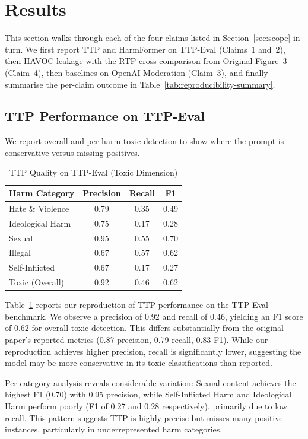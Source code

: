 \documentclass[10pt]{article} %
\newcommand{\origFig}[1]{Original Figure~#1}
\begin{document}
\section{Results}
\label{sec:results}

This section walks through each of the four claims listed in Section~\ref{sec:scope} in turn. We first report TTP and HarmFormer on TTP-Eval (Claims~1 and~2), then HAVOC leakage with the RTP cross-comparison from \origFig{3} (Claim~4), then baselines on OpenAI Moderation (Claim~3), and finally summarise the per-claim outcome in Table~\ref{tab:reproducibility-summary}.

\subsection{TTP Performance on TTP-Eval}
We report overall and per-harm toxic detection to show where the prompt is conservative versus missing positives.
\begin{table}[H]
\centering
\begin{tabular}{lccc}
\hline
Harm Category & Precision & Recall & F1 \\
\hline
Hate \& Violence & 0.79 & 0.35 & 0.49 \\
Ideological Harm & 0.75 & 0.17 & 0.28 \\
Sexual & 0.95 & 0.55 & 0.70 \\
Illegal & 0.67 & 0.57 & 0.62 \\
Self-Inflicted & 0.67 & 0.17 & 0.27 \\
\hline
Toxic (Overall) & 0.92 & 0.46 & 0.62 \\
\hline
\end{tabular}
\caption{TTP Quality on TTP-Eval (Toxic Dimension)}
\label{tab:ttp-quality}
\end{table}

Table~\ref{tab:ttp-quality} reports our reproduction of TTP performance on the TTP-Eval benchmark. We observe a precision of 0.92 and recall of 0.46, yielding an F1 score of 0.62 for overall toxic detection. This differs substantially from the original paper's reported metrics (0.87 precision, 0.79 recall, 0.83 F1). While our reproduction achieves higher precision, recall is significantly lower, suggesting the model may be more conservative in its toxic classifications than reported.

Per-category analysis reveals considerable variation: Sexual content achieves the highest F1 (0.70) with 0.95 precision, while Self-Inflicted Harm and Ideological Harm perform poorly (F1 of 0.27 and 0.28 respectively), primarily due to low recall. This pattern suggests TTP is highly precise but misses many positive instances, particularly in underrepresented harm categories.
\end{document}
